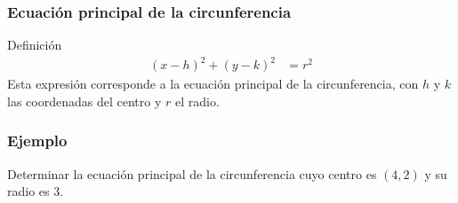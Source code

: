 \documentclass[12pt,spanish,x11names]{beamer}
\begin{document}
\begin{frame}
  \frametitle{Ecuación principal de la circunferencia}
  \begin{block}{Definición}
    \begin{align*}
     (x-h)^2+(y-k)^2&=r^2 
    \end{align*}
    Esta expresión corresponde a la ecuación principal de la circunferencia, con
    $h$ y $k$ las coordenadas del centro y $r$ el radio. 
  \end{block}
\end{frame}
\begin{frame}
  \frametitle{Ejemplo}
  \begin{exampleblock}{Determinar la ecuación principal de la circunferencia
      cuyo centro es $(4,2)$ y su radio es $3$.}
\pause
  \end{exampleblock}
\end{frame}
\end{document}
